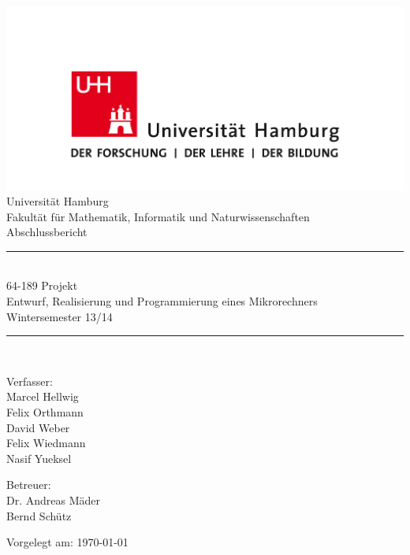 \documentclass[11pt,a4paper,twoside,openright,headinclude,bibtotoc,bigheadings,final]{scrreprt}
\begin{document}
\begin{titlepage} %
\centering
\begin{center}
\includegraphics[width=\textwidth]{images/uhh.png}\\
{\LARGE Universität Hamburg}\\[.25em]
{\Large Fakultät für Mathematik, Informatik und Naturwissenschaften}\\[3em]
{\Huge Abschlussbericht}\\[3em]

\newcommand{\HRule}{\rule{\linewidth}{0.5mm}}
\HRule\\[.4em]
{\Large%
64-189 Projekt\\%
Entwurf, Realisierung und Programmierung eines Mikrorechners\\%
Wintersemester 13/14\\%
}
\HRule\\[3em]

\begin{minipage}[t]{0.4\textwidth}
\begin{flushleft} \large
Verfasser:\\[1em]%
Marcel Hellwig\\%
Felix Orthmann\\%
David Weber\\%
Felix Wiedmann\\%
Nasif Yueksel%
\end{flushleft}
\end{minipage}
\hfill
\begin{minipage}[t]{0.4\textwidth}
\begin{flushright} \large
Betreuer:\\[1em]
Dr. Andreas Mäder\\%
Bernd Schütz%
\end{flushright}
\end{minipage}

\vfill

{\large Vorgelegt am: \today}
\end{center}
\end{titlepage}
\newpage
\end{document}
